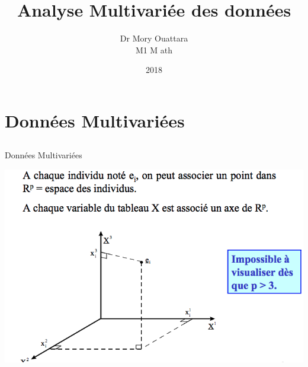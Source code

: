 \documentclass[12pt]{beamer}
\author{Dr Mory Ouattara\\  M1 M
ath}
\title{Analyse Multivariée des données}
\institute{UNA}
\date{2018}
\begin{document}
\begin{frame}
\titlepage
\end{frame}

\begin{frame}
\tableofcontents
\end{frame}

\section{Données Multivariées}

\subsection{ }





\begin{frame}{Données Multivariées}

  
\centering 
 \includegraphics[scale=0.45]{Proj1.png} 
 

\end{frame}
\end{document}
